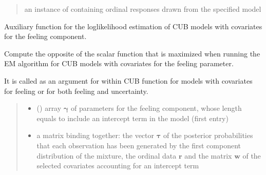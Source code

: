 \documentclass[letterpaper,10pt,english]{sphinxmanual}
\begin{document}
\begin{fulllineitems}
\begin{quote}
\begin{description}
\begin{itemize}
\end{itemize}

\sphinxAtStartPar
an instance of  containing ordinal responses drawn from the specified model

\end{description}\end{quote}

\end{fulllineitems}


\begin{fulllineitems}
\label{\detokenize{cubmods:cubmods.cub_0w.effe01}}
\pysigstartsignatures
{}
\pysigstopsignatures
\sphinxAtStartPar
Auxiliary function for the log\sphinxhyphen{}likelihood estimation of CUB models
with covariates for the feeling component.

\sphinxAtStartPar
Compute the opposite of the scalar function that is maximized when running 
the E\sphinxhyphen{}M algorithm for CUB models with covariates for the feeling parameter.

\sphinxAtStartPar
It is called as an argument for  within CUB function for models with covariates for
feeling or for both feeling and uncertainty.
\begin{quote}\begin{description}
\begin{itemize}
\item {} 
\sphinxAtStartPar
{} () \textendash{} array \(\pmb \gamma\) of parameters for the feeling component, whose length equals 
 to include an intercept term in the model (first entry)

\item {} 
\sphinxAtStartPar
{} \textendash{} a matrix binding together: the vector \(\pmb\tau\) of the posterior probabilities
that each observation has been generated by the first component distribution of the mixture, 
the ordinal data \(\pmb r\) and the matrix \(\pmb w\) of the selected covariates 
accounting for an intercept term


\end{itemize}
\end{description}
\end{quote}
\end{fulllineitems}
\end{document}
